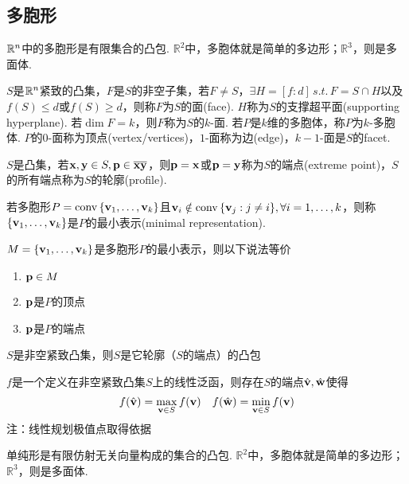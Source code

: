 \subsection{多胞形}
\begin{definition}
$\mathbb{R}^n$中的多胞形是有限集合的凸包. $\mathbb{R}^2$中，多胞体就是简单的多边形；$\mathbb{R}^3$，则是多面体.
\end{definition}
\begin{definition}
\rm $S$是$\mathbb{R}^n$紧致的凸集，$F$是$S$的非空子集，若$F\ne S$，$\exists H=[f:d]\,s.t.\,F=S\cap H$以及$f(S)\leq d$或$f(S)\geq d$，则称$F$为$S$的面(face). $H$称为$S$的支撑超平面(supporting hyperplane). 若$\dim F=k$，则$F$称为$S$的$k$-面. 若$P$是$k$维的多胞体，称$P$为$k$-多胞体. $P$的$0$-面称为顶点(vertex/vertices)，$1$-面称为边(edge)，$k-1$-面是$S$的facet.
\end{definition}
\begin{definition}[端点]
\rm $S$是凸集，若$\mathbf{x},\mathbf{y}\in S,\mathbf{p}\in\overline{\mathbf{x}\mathbf{y}}$，则$\mathbf{p}=\mathbf{x}$或$\mathbf{p}=\mathbf{y}$称为$S$的端点(extreme point)，$S$的所有端点称为$S$的轮廓(profile).
\end{definition}
\begin{definition}[最小表示]
\rm 若多胞形$P=\mathrm{conv}\,\{\mathbf{v}_1,\dots,\mathbf{v}_k\}$且$\mathbf{v}_i\notin\mathrm{conv}\,\{\mathbf{v}_j:j\ne i\},\forall i=1,\dots,k$，则称$\{\mathbf{v}_1,\dots,\mathbf{v}_k\}$是$P$的最小表示(minimal representation).
\end{definition}
\begin{theorem}
$M=\{\mathbf{v}_1,\dots,\mathbf{v}_k\}$是多胞形$P$的最小表示，则以下说法等价
\begin{enumerate}
	\itemsep -3pt
	\item $\mathbf{p}\in M$
	\item $\mathbf{p}$是$P$的顶点
	\item $\mathbf{p}$是$P$的端点
\end{enumerate}
\end{theorem}
\begin{theorem}
$S$是非空紧致凸集，则$S$是它轮廓（$S$的端点）的凸包
\end{theorem}
\begin{theorem}
$f$是一个定义在非空紧致凸集$S$上的线性泛函，则存在$S$的端点$\hat{\mathbf{v}},\hat{\mathbf{w}}$使得
\[f(\hat{\mathbf{v}})=\max_{\mathbf{v}\in S}f(\mathbf{v})\quad f(\hat{\mathbf{w}})=\min_{\mathbf{v}\in S}f(\mathbf{v})\]
注：线性规划极值点取得依据
\end{theorem}
\begin{definition}
单纯形是有限仿射无关向量构成的集合的凸包. $\mathbb{R}^2$中，多胞体就是简单的多边形；$\mathbb{R}^3$，则是多面体.
\end{definition}
